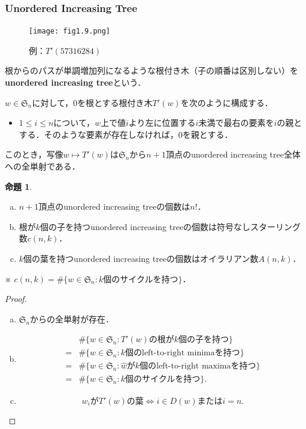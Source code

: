 \documentclass[xelatex,ja=standard,a4paper,14pt,everyparhook=compat]{bxjsarticle}
\newcommand{\fS}{\mathfrak{S}}
\theoremstyle{definition}
\newtheorem{proposition}[theorem]{命題}
\begin{document}
\subsubsection{Unordered Increasing Tree}

\begin{figure}
    \centering
    \texttt{[image: fig1.9.png]}
    \captionsetup{labelformat=empty}
    \caption{例：$T'(57316284)$}
\end{figure}

根からのパスが単調増加列になるような根付き木（子の順番は区別しない）を\textbf{unordered increasing tree}という．

$w \in \fS_n$に対して，$0$を根とする根付き木$T'(w)$を次のように構成する．
\begin{itemize}
    \item $1 \leq i \leq n$について，$w$上で値$i$より左に位置する$i$未満で最右の要素を$i$の親とする．そのような要素が存在しなければ，$0$を親とする．
\end{itemize}

このとき，写像$w \mapsto T'(w)$は$\fS_n$から$n+1$頂点のunordered increasing tree全体への全単射である．

\begin{proposition}
    \begin{enumerate}[(a)]
        \item $n+1$頂点のunordered increasing treeの個数は$n!$．
        \item 根が$k$個の子を持つunordered increasing treeの個数は符号なしスターリング数$c(n, k)$．
        \item $k$個の葉を持つunordered increasing treeの個数はオイラリアン数$A(n, k)$．
    \end{enumerate}
\end{proposition}

※ $c(n, k) = \# \{w \in \fS_n : \text{$k$個のサイクルを持つ}\}$．

\begin{proof}
    \begin{enumerate}[(a)]
        \item $\fS_n$からの全単射が存在．
        \item \begin{align*}
            & \#\{w \in \fS_n : \text{$T'(w)$の根が$k$個の子を持つ}\} \\
            ={}& \# \{w \in \fS_n : \text{$k$個のleft-to-right minimaを持つ}\} \\
            ={}& \# \{w \in \fS_n : \text{$\widehat w$が$k$個のleft-to-right maximaを持つ}\} \\
            ={}& \# \{w \in \fS_n : \text{$k$個のサイクルを持つ}\}.
        \end{align*}
        \item \begin{equation*}
            \text{$w_i$が$T'(w)$の葉} \Longleftrightarrow \text{$i \in D(w)$または$i=n$}.
        \end{equation*}
    \end{enumerate}
\end{proof}
\end{document}

